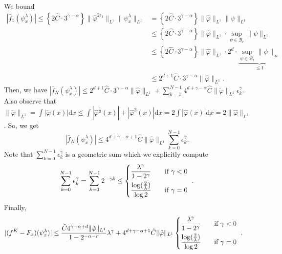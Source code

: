 We bound
\begin{align*}
    |\bar f_1(\psi_x^\lambda)| \leq \left\{ 2\hat C \cdot  3^{\gamma - \alpha} \right\} \lVert \hat \varphi^{2\epsilon_1} \rVert_{L^1} \lVert  \psi^{\lambda}_x \rVert_{L^1} &= \left\{ 2\hat C \cdot  3^{\gamma - \alpha} \right\} \lVert \hat \varphi \rVert_{L^1} \lVert  \psi \rVert_{L^1} \\
    &\leq \left\{ 2\hat C \cdot  3^{\gamma - \alpha} \right\}  \lVert \hat \varphi \rVert_{L^1} \cdot \sup_{\psi \in \mathcal{B}_r} \lVert  \psi \rVert_{L^1} \\
    &\leq \left\{ 2\hat C \cdot  3^{\gamma - \alpha} \right\}  \lVert \hat \varphi \rVert_{L^1} \cdot 2^d \cdot \underbrace{\sup_{\psi \in \mathcal{B}_r} \lVert  \psi \rVert_{\infty}}_{\leq 1} \\
    &\leq 2^{d+1}\hat C \cdot  3^{\gamma - \alpha}  \lVert \hat \varphi \rVert_{L^1}.
\end{align*}
Then, we have $|\bar f_N(\psi_x^\lambda)| \leq 2^{d+1}\hat C \cdot  3^{\gamma - \alpha}  \lVert \hat \varphi \rVert_{L^1} + \sum^{N-1}_{k=1} 4^{d+\gamma-\alpha}\hat C \lVert \check \varphi \rVert_{L^1} \epsilon^\gamma_k$. Also observe that 
$\lVert \check \varphi \rVert_{L^1} = \int |\check \varphi(x)| \mathrm{d}x \leq \int|\hat \varphi^{\frac{1}{2}}(x)| + |\hat \varphi^{2}(x)| \mathrm{d}x = 2\int |\hat \varphi(x)| \mathrm{d}x = 2 \lVert \hat \varphi \rVert_{L^1}$. So, we get 
$$
|\bar f_N(\psi_x^\lambda)| \leq 4^{d + \gamma - \alpha + 1} \hat C \lVert \hat \varphi \rVert_{L^1} \sum^{N-1}_{k=0}\epsilon^\gamma_k.
$$
Note that $\sum^{N-1}_{k=0}\epsilon^\gamma_k$ is a geometric sum which we explicitly compute
\begin{align*}
    \sum^{N-1}_{k=0}\epsilon^\gamma_k = 
    \sum^{N-1}_{k=0}2^{-\gamma k} \leq \begin{dcases}
        \frac{\lambda^\gamma}{1-2^\gamma} \quad &\text{if $\gamma < 0$ } \\
        \frac{\log(\frac{2}{\lambda})}{\log 2} &\text{if $\gamma = 0$ }
    \end{dcases}.
\end{align*} 
Finally,
\begin{align*}
    |(f^K - F_x)(\psi_x^\lambda)| &\leq  \frac{\hat C 4^{\gamma - \alpha + d} \lVert \check \varphi \rVert_{L^1} }{1-2^{-\alpha - r}} \lambda^{\gamma} + 4^{d + \gamma - \alpha + 1} \hat C \lVert \hat \varphi \rVert_{L^1}\begin{dcases}
        \frac{\lambda^\gamma}{1-2^\gamma} \quad &\text{if $\gamma < 0$ } \\
        \frac{\log(\frac{2}{\lambda})}{\log 2} &\text{if $\gamma = 0$ }
    \end{dcases}.
\end{align*}
